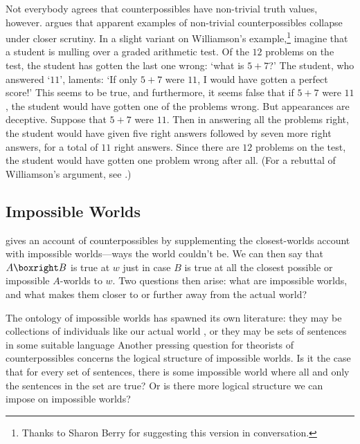 Not everybody agrees that counterpossibles have non-trivial truth values, however.  \citet[172]{williamson-philofphil} argues that apparent examples of non-trivial counterpossibles collapse under closer scrutiny.  In a slight variant on Williamson's example,\footnote{Thanks to Sharon Berry for suggesting this version in conversation.} imagine that a student is mulling over a graded arithmetic test.  Of the $12$ problems on the test, the student has gotten the last one wrong: `what is $5+7$?'  The student, who answered `$11$', laments: `If only $5+7$ were $11$, I would have gotten a perfect score!'  This seems to be true, and furthermore, it seems false that if $5+7$ were $11$, the student would have gotten one of the problems wrong.  But appearances are deceptive.  Suppose that $5+7$ were $11$.  Then in answering all the problems right, the student would have given five right answers followed by seven more right answers, for a total of $11$ right answers.  Since there are $12$ problems on the test, the student would have gotten one problem wrong after all.  (For a rebuttal of Williamson's argument, see \citealp{SalernoForthcoming-SALWOC}.)


\subsection{Impossible Worlds}

\citet{Nolan1997-DANIWA} gives an account of counterpossibles by supplementing the closest-worlds account with impossible worlds---ways the world couldn't be. We can then say that $A \boxright B$ is true at $w$ just in case $B$ is true at all the closest possible or impossible $A$-worlds to $w$.  Two questions then arise: what are impossible worlds, and what makes them closer to or further away from the actual world?

The ontology of impossible worlds has spawned its own literature: they may be collections of individuals like our actual world \citep{Yagisawa2010-YAGWAI}, or they may be sets of sentences in some suitable language \citetext{\citealp{Hintikka1975-HINIPW, melia:reducing, sider:pluriverse}; see \citealp{Berto2013-BERIW}, for a general overview and discussion.}  Another pressing question for theorists of counterpossibles concerns the logical structure of impossible worlds.  Is it the case that for every set of sentences, there is some impossible world where all and only the sentences in the set are true?  Or is there more logical structure we can impose on impossible worlds?


